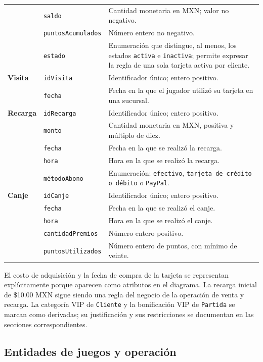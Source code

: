 \begin{center}
\begin{tabularx}{\textwidth}{@{}>{\bfseries\color{unamblue}}p{}p{}X@{}}
 & \texttt{saldo} & Cantidad monetaria en MXN; valor no negativo. \\
 & \texttt{puntosAcumulados} & Número entero no negativo. \\
 & \texttt{estado} & Enumeración que distingue, al menos, los estados
   \texttt{activa} e \texttt{inactiva}; permite expresar la regla de una sola
   tarjeta activa por cliente. \\
\midrule
Visita & \texttt{idVisita} & Identificador único; entero positivo. \\
 & \texttt{fecha} & Fecha en la que el jugador utilizó su tarjeta en una
   sucursal. \\
\midrule
Recarga & \texttt{idRecarga} & Identificador único; entero positivo. \\
 & \texttt{monto} & Cantidad monetaria en MXN, positiva y múltiplo de diez. \\
 & \texttt{fecha} & Fecha en la que se realizó la recarga. \\
 & \texttt{hora} & Hora en la que se realizó la recarga. \\
 & \texttt{métodoAbono} & Enumeración: \texttt{efectivo}, \texttt{tarjeta de
   crédito o débito} o \texttt{PayPal}. \\
\midrule
Canje & \texttt{idCanje} & Identificador único; entero positivo. \\
 & \texttt{fecha} & Fecha en la que se realizó el canje. \\
 & \texttt{hora} & Hora en la que se realizó el canje. \\
 & \texttt{cantidadPremios} & Número entero positivo. \\
 & \texttt{puntosUtilizados} & Número entero de puntos, con mínimo de veinte. \\
\bottomrule
\end{tabularx}
\end{center}

El costo de adquisición y la fecha de compra de la tarjeta se representan
explícitamente porque aparecen como atributos en el diagrama. La recarga
inicial de \$10.00 MXN sigue siendo una regla del negocio de la operación de
venta y recarga. La categoría VIP de \texttt{Cliente} y la bonificación VIP de
\texttt{Partida} se marcan como derivadas; su justificación y sus restricciones
se documentan en las secciones correspondientes.

\subsection{Entidades de juegos y operación}

